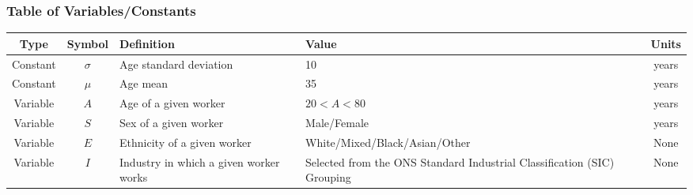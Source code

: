             \subsubsection{Table of Variables/Constants}
                \begin{table}[H]
                  \begin{center}
                    \label{tab:variables2} %
                    \begin{tabular}{|c|c|p{6cm}|p{6cm}|c|} %
                      \toprule 
                       \textbf{Type} & \textbf{Symbol} & \textbf{Definition} & \textbf{Value} & \textbf{Units} \\
                      \midrule 
                       Constant & \(\sigma\) & Age standard deviation & 10 & years  \\ %
                      \midrule 
                       Constant & \(\mu\) & Age mean & 35 & years  \\ %
                      \midrule 
                       Variable & \(A\) & Age of a given worker & $20 < A < 80$ & years  \\ %
                      \midrule 
                       Variable & \(S\) & Sex of a given worker & Male/Female & years  \\ %
                      \midrule 
                       Variable & \(E\) & Ethnicity of a given worker & White/Mixed/Black/Asian/Other & None  \\ %
                      \midrule 
                       Variable & \(I\) & Industry in which a given worker works & Selected from the ONS Standard Industrial Classification (SIC) Grouping \cite{ONSGroup} & None  \\ %

\end{tabular}
\end{center}
\end{table}
